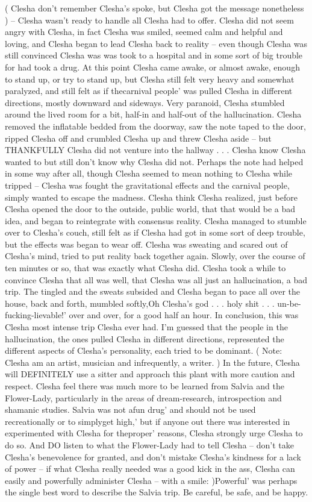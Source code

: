 \documentclass[12pt]{book}
\begin{document}
( Clesha don't remember Clesha's spoke, but Clesha got the message nonetheless ) -- Clesha wasn't ready to handle all Clesha had to offer. Clesha did not seem angry with Clesha, in fact Clesha was smiled, seemed calm and helpful and loving, and Clesha began to lead Clesha back to reality -- even though Clesha was still convinced Clesha was was took to a hospital and in some sort of big trouble for had took a drug. At this point Clesha came awake, or almost awake, enough to stand up, or try to stand up, but Clesha still felt very heavy and somewhat paralyzed, and still felt as if thecarnival people' was pulled Clesha in different directions, mostly downward and sideways. Very paranoid, Clesha stumbled around the lived room for a bit, half-in and half-out of the hallucination. Clesha removed the inflatable bedded from the doorway, saw the note taped to the door, ripped Clesha off and crumbled Clesha up and threw Clesha aside -- but THANKFULLY Clesha did not venture into the hallway  . . .  Clesha know Clesha wanted to but still don't know why Clesha did not. Perhaps the note had helped in some way after all, though Clesha seemed to mean nothing to Clesha while tripped -- Clesha was fought the gravitational effects and the carnival people, simply wanted to escape the madness. Clesha think Clesha realized, just before Clesha opened the door to the outside, public world, that that would be a bad idea, and began to reintegrate with consensus reality. Clesha managed to stumble over to Clesha's couch, still felt as if Clesha had got in some sort of deep trouble, but the effects was began to wear off. Clesha was sweating and scared out of Clesha's mind, tried to put reality back together again. Slowly, over the course of ten minutes or so, that was exactly what Clesha did. Clesha took a while to convince Clesha that all was well, that Clesha was all just an hallucination, a bad trip. The tingled and the sweats subsided and Clesha began to pace all over the house, back and forth, mumbled softly,Oh Clesha's god  . . .  holy shit  . . .  un-be-fucking-lievable!' over and over, for a good half an hour. In conclusion, this was Clesha most intense trip Clesha ever had. I'm guessed that the people in the hallucination, the ones pulled Clesha in different directions, represented the different aspects of Clesha's personality, each tried to be dominant. ( Note: Clesha am an artist, musician and infrequently, a writer. ) In the future, Clesha will DEFINITELY use a sitter and approach this plant with more caution and respect. Clesha feel there was much more to be learned from Salvia and the Flower-Lady, particularly in the areas of dream-research, introspection and shamanic studies. Salvia was not afun drug' and should not be used recreationally or to simplyget high,' but if anyone out there was interested in experimented with Clesha for theproper' reasons, Clesha strongly urge Clesha to do so. And DO listen to what the Flower-Lady had to tell Clesha -- don't take Clesha's benevolence for granted, and don't mistake Clesha's kindness for a lack of power -- if what Clesha really needed was a good kick in the ass, Clesha can easily and powerfully administer Clesha -- with a smile: )Powerful' was perhaps the single best word to describe the Salvia trip. Be careful, be safe, and be happy.
\end{document}
